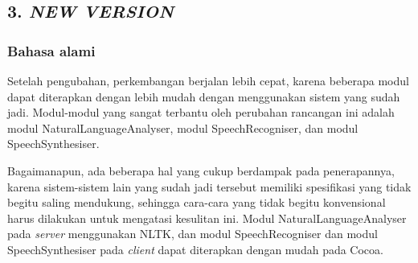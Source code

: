\subsection*{\textcolor{subsectioncolor}{\textsf{3. \textit{NEW VERSION}}}}

\subsubsection*{Bahasa alami}

Setelah pengubahan, perkembangan berjalan lebih cepat,
karena beberapa modul dapat diterapkan dengan lebih mudah dengan menggunakan sistem yang sudah jadi.
Modul-modul yang sangat terbantu oleh perubahan rancangan ini adalah modul NaturalLanguageAnalyser, modul SpeechRecogniser, dan modul SpeechSynthesiser.

Bagaimanapun, ada beberapa hal yang cukup berdampak pada penerapannya,
karena sistem-sistem lain yang sudah jadi tersebut memiliki spesifikasi yang tidak begitu saling mendukung,
sehingga cara-cara yang tidak begitu konvensional harus dilakukan untuk mengatasi kesulitan ini.
Modul NaturalLanguageAnalyser pada \textit{server} menggunakan NLTK, dan modul SpeechRecogniser dan modul SpeechSynthesiser pada \textit{client} dapat diterapkan dengan mudah pada Cocoa.
